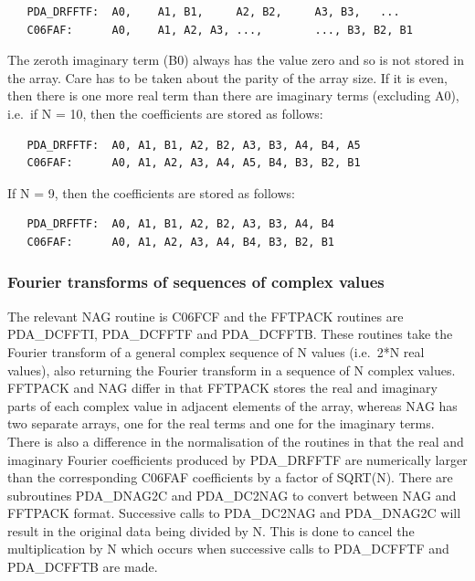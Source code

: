 \documentclass[11pt,twoside]{article}
\newcommand{\htmlref}[2]{#1}
\newcommand{\xlabel}[1]{}
\begin{document}
\begin{verbatim}
   PDA_DRFFTF:  A0,    A1, B1,     A2, B2,     A3, B3,   ...
   C06FAF:      A0,    A1, A2, A3, ...,        ..., B3, B2, B1
\end{verbatim}

   The zeroth imaginary term (B0) always has the value zero and so is
   not stored in the array. Care has to be taken about the parity of the
   array size. If it is even, then there is one more real term than
   there are imaginary terms (excluding A0), i.e.\ if N = 10, then the
   coefficients are stored as follows:

\begin{verbatim}
   PDA_DRFFTF:  A0, A1, B1, A2, B2, A3, B3, A4, B4, A5
   C06FAF:      A0, A1, A2, A3, A4, A5, B4, B3, B2, B1
\end{verbatim}

   If N = 9, then the coefficients are stored as follows:

\begin{verbatim}
   PDA_DRFFTF:  A0, A1, B1, A2, B2, A3, B3, A4, B4
   C06FAF:      A0, A1, A2, A3, A4, B4, B3, B2, B1
\end{verbatim}


\subsubsection{\xlabel{fourier_transforms_of_sequences_of_complex_values}Fourier transforms of sequences of complex values}

   The relevant NAG routine is C06FCF and the FFTPACK routines are
   PDA\_DCFFTI, PDA\_\-DCFFTF and PDA\_DCFFTB. These routines take the Fourier transform
   of a general complex sequence of N values (i.e.\ 2*N real values),
   also returning the Fourier transform in a sequence of N complex
   values. FFTPACK and NAG differ in that FFTPACK stores the real and
   imaginary parts of each complex value in adjacent elements of the
   array, whereas NAG has two separate arrays, one for the real terms
   and one for the imaginary terms. There is also a difference in the
   normalisation of the routines in that the real and imaginary Fourier
   coefficients produced by PDA\_DRFFTF are numerically larger than the
   corresponding C06FAF coefficients by a factor of SQRT(N). There are
   subroutines
\htmlref{PDA\_DNAG2C}{PDA\_NAG2C} and
\htmlref{PDA\_DC2NAG}{PDA\_C2NAG}
   to convert between NAG and FFTPACK format. Successive calls to
   PDA\_DC2NAG and PDA\_DNAG2C will result in the original data being divided by
   N. This is done to cancel the multiplication by N which occurs when
   successive calls to PDA\_DCFFTF and PDA\_DCFFTB are made.
\end{document}
